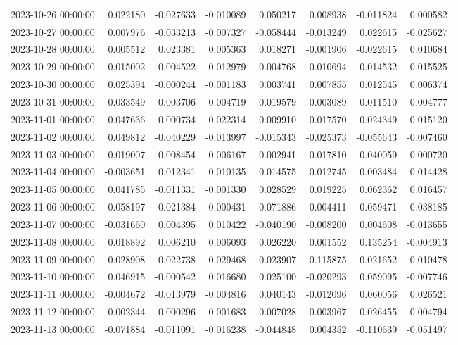 \begin{tabular}{lrrrrrrr}
2023-10-26 00:00:00 & 0.022180 & -0.027633 & -0.010089 & 0.050217 & 0.008938 & -0.011824 & 0.000582 \\
2023-10-27 00:00:00 & 0.007976 & -0.033213 & -0.007327 & -0.058444 & -0.013249 & 0.022615 & -0.025627 \\
2023-10-28 00:00:00 & 0.005512 & 0.023381 & 0.005363 & 0.018271 & -0.001906 & -0.022615 & 0.010684 \\
2023-10-29 00:00:00 & 0.015002 & 0.004522 & 0.012979 & 0.004768 & 0.010694 & 0.014532 & 0.015525 \\
2023-10-30 00:00:00 & 0.025394 & -0.000244 & -0.001183 & 0.003741 & 0.007855 & 0.012545 & 0.006374 \\
2023-10-31 00:00:00 & -0.033549 & -0.003706 & 0.004719 & -0.019579 & 0.003089 & 0.011510 & -0.004777 \\
2023-11-01 00:00:00 & 0.047636 & 0.000734 & 0.022314 & 0.009910 & 0.017570 & 0.024349 & 0.015120 \\
2023-11-02 00:00:00 & 0.049812 & -0.040229 & -0.013997 & -0.015343 & -0.025373 & -0.055643 & -0.007460 \\
2023-11-03 00:00:00 & 0.019007 & 0.008454 & -0.006167 & 0.002941 & 0.017810 & 0.040059 & 0.000720 \\
2023-11-04 00:00:00 & -0.003651 & 0.012341 & 0.010135 & 0.014575 & 0.012745 & 0.003484 & 0.014428 \\
2023-11-05 00:00:00 & 0.041785 & -0.011331 & -0.001330 & 0.028529 & 0.019225 & 0.062362 & 0.016457 \\
2023-11-06 00:00:00 & 0.058197 & 0.021384 & 0.000431 & 0.071886 & 0.004411 & 0.059471 & 0.038185 \\
2023-11-07 00:00:00 & -0.031660 & 0.004395 & 0.010422 & -0.040190 & -0.008200 & 0.004608 & -0.013655 \\
2023-11-08 00:00:00 & 0.018892 & 0.006210 & 0.006093 & 0.026220 & 0.001552 & 0.135254 & -0.004913 \\
2023-11-09 00:00:00 & 0.028908 & -0.022738 & 0.029468 & -0.023907 & 0.115875 & -0.021652 & 0.010478 \\
2023-11-10 00:00:00 & 0.046915 & -0.000542 & 0.016680 & 0.025100 & -0.020293 & 0.059095 & -0.007746 \\
2023-11-11 00:00:00 & -0.004672 & -0.013979 & -0.004816 & 0.040143 & -0.012096 & 0.060056 & 0.026521 \\
2023-11-12 00:00:00 & -0.002344 & 0.000296 & -0.001683 & -0.007028 & -0.003967 & -0.026455 & -0.004794 \\
2023-11-13 00:00:00 & -0.071884 & -0.011091 & -0.016238 & -0.044848 & 0.004352 & -0.110639 & -0.051497 \\

\end{tabular}
